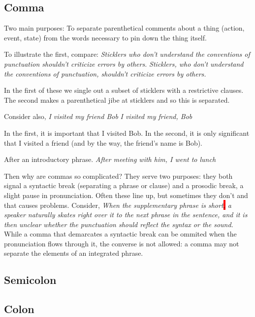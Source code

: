 \documentclass{article}
\newcommand{\hlq}[1]{\colorbox{red}{#1}}
\newcommand{\example}[1]{\newline \textit{#1}}
\begin{document}
\subsection{Comma}

Two main purposes:
To separate parenthetical comments about a thing (action, event, state) from the words necessary to pin down the thing itself.


To illustrate the first, compare:
\example{Sticklers who don't understand the conventions of punctuation shouldn't criticize errors by others.}
\example{Sticklers, who don't understand the conventions of punctuation, shouldn't criticize errors by others.}

In the first of these we single out a subset of sticklers with a restrictive clauses. The second makes a parenthetical jibe at sticklers and so this is separated.

Consider also,
\example{I visited my friend Bob}
\example{I visited my friend, Bob}

In the first, it is important that I visited Bob. In the second, it is only significant that I visited a friend (and by the way, the friend's name is Bob).

After an introductory phrase.
\example{After meeting with him, I went to lunch}



Then why are commas so complicated? They serve two purposes: they both signal a syntactic break (separating a phrase or clause) and a prosodic break, a slight pause in pronunciation.
Often these line up, but sometimes they don't and that causes problems. Consider,
\example{When the supplementary phrase is short\hlq{,} a speaker naturally skates right over it to the next phrase in the sentence, and it is then unclear whether the punctuation should reflect the syntax or the sound.}
While a comma that demarcates a syntactic break can be ommited when the pronunciation flows through it, the converse is not allowed: a comma may not separate the elements of an integrated phrase.

\subsection{Semicolon}

\subsection{Colon}
\end{document}
